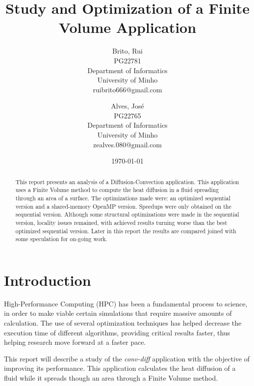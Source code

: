 \documentclass[a4paper,10pt,openright,openbib,twocolumn]{article}
\begin{document}
\title{Study and Optimization of a Finite Volume Application}
\date{\today}
\begin{multicols}{2}
\author{
    Brito, Rui\\
    PG22781\\
    Department of Informatics\\
    University of Minho\\
    ruibrito666@gmail.com
  \and
    Alves, José\\
    PG22765\\
    Department of Informatics\\
    University of Minho\\
    zealves.080@gmail.com
}
\date{}
\maketitle
\end{multicols}

\begin{abstract}
    This report presents an analysis of a Diffusion-Convection application. This application uses a Finite Volume method to compute the heat diffusion in a fluid spreading through an area of a surface. The optimizations made were: an optimized sequential version and a shared-memory OpenMP version.
    Speedups were only obtained on the sequential version. Although some structural optimizations were made in the sequential version, locality issues remained, with achieved results turning worse than the best optimized sequential version.
    Later in this report the results are compared joined with some speculation for on-going work.  
\end{abstract}

\section{Introduction}    %

High-Performance Computing (HPC) has been a fundamental process to science, in order to make viable certain simulations that require massive amounts of calculation. The use of several optimization techniques has helped decrease the execution time of different algorithms, providing critical results faster, thus helping research move forward at a faster pace.

This report will describe a study of the \emph{conv-diff} application with the objective of improving its performance. This application calculates the heat diffusion of a fluid while it spreads though an area through a Finite Volume method. 
\end{document}
